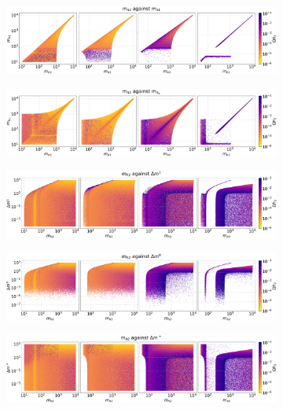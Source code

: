 \documentclass[12pt]{article}
\begin{document}
\begin{figure}[H]
    \begin{subfigure}{\textwidth}
      \centering
      \includegraphics[width=1\columnwidth]{4plot/MD2_MD1.pdf}
    \end{subfigure}

    \begin{subfigure}{\textwidth}
      \centering
      \includegraphics[width=1\columnwidth]{4plot/MD2_MDP.pdf}
    \end{subfigure}
    
    \begin{subfigure}{\textwidth}
      \centering
      \includegraphics[width=1\columnwidth]{4plot/MD2_DM2.pdf}
    \end{subfigure}
    
    \begin{subfigure}{\textwidth}
      \centering
      \includegraphics[width=1\columnwidth]{4plot/MD2_DM3.pdf}
    \end{subfigure}

    \begin{subfigure}{\textwidth}
      \centering
      \includegraphics[width=1\columnwidth]{4plot/MD2_DMP.pdf}
    \end{subfigure}


\end{figure}
\end{document}
